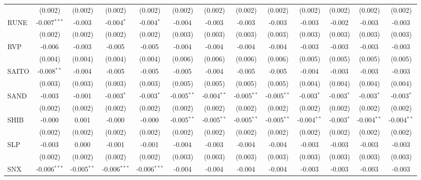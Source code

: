 \begin{table}[!htbp]
\begin{tabular}{@{\extracolsep{5pt}}lcccccccccccc}
  & (0.002) & (0.002) & (0.002) & (0.002) & (0.002) & (0.002) & (0.002) & (0.002) & (0.002) & (0.002) & (0.002) & (0.002) \\
 RUNE & -0.007$^{***}$ & -0.003$^{}$ & -0.004$^{*}$ & -0.004$^{*}$ & -0.004$^{}$ & -0.003$^{}$ & -0.003$^{}$ & -0.003$^{}$ & -0.003$^{}$ & -0.002$^{}$ & -0.003$^{}$ & -0.003$^{}$ \\
  & (0.002) & (0.002) & (0.002) & (0.002) & (0.003) & (0.003) & (0.003) & (0.003) & (0.003) & (0.003) & (0.003) & (0.003) \\
 RVP & -0.006$^{}$ & -0.003$^{}$ & -0.005$^{}$ & -0.005$^{}$ & -0.004$^{}$ & -0.004$^{}$ & -0.004$^{}$ & -0.004$^{}$ & -0.003$^{}$ & -0.003$^{}$ & -0.003$^{}$ & -0.003$^{}$ \\
  & (0.004) & (0.004) & (0.004) & (0.004) & (0.006) & (0.006) & (0.006) & (0.006) & (0.005) & (0.005) & (0.005) & (0.005) \\
 SAITO & -0.008$^{**}$ & -0.004$^{}$ & -0.005$^{}$ & -0.005$^{}$ & -0.005$^{}$ & -0.004$^{}$ & -0.005$^{}$ & -0.005$^{}$ & -0.004$^{}$ & -0.003$^{}$ & -0.003$^{}$ & -0.003$^{}$ \\
  & (0.003) & (0.003) & (0.003) & (0.003) & (0.005) & (0.005) & (0.005) & (0.005) & (0.004) & (0.004) & (0.004) & (0.004) \\
 SAND & -0.003$^{}$ & -0.001$^{}$ & -0.003$^{*}$ & -0.003$^{*}$ & -0.005$^{**}$ & -0.004$^{**}$ & -0.005$^{**}$ & -0.005$^{**}$ & -0.003$^{*}$ & -0.003$^{*}$ & -0.003$^{*}$ & -0.003$^{*}$ \\
  & (0.002) & (0.002) & (0.002) & (0.002) & (0.002) & (0.002) & (0.002) & (0.002) & (0.002) & (0.002) & (0.002) & (0.002) \\
 SHIB & -0.000$^{}$ & 0.001$^{}$ & -0.000$^{}$ & -0.000$^{}$ & -0.005$^{**}$ & -0.005$^{**}$ & -0.005$^{**}$ & -0.005$^{**}$ & -0.004$^{**}$ & -0.003$^{*}$ & -0.004$^{**}$ & -0.004$^{**}$ \\
  & (0.002) & (0.002) & (0.002) & (0.002) & (0.002) & (0.002) & (0.002) & (0.002) & (0.002) & (0.002) & (0.002) & (0.002) \\
 SLP & -0.003$^{}$ & 0.000$^{}$ & -0.001$^{}$ & -0.001$^{}$ & -0.004$^{}$ & -0.003$^{}$ & -0.004$^{}$ & -0.004$^{}$ & -0.003$^{}$ & -0.003$^{}$ & -0.003$^{}$ & -0.003$^{}$ \\
  & (0.002) & (0.002) & (0.002) & (0.002) & (0.003) & (0.003) & (0.003) & (0.003) & (0.003) & (0.003) & (0.003) & (0.003) \\
 SNX & -0.006$^{***}$ & -0.005$^{**}$ & -0.006$^{***}$ & -0.006$^{***}$ & -0.004$^{}$ & -0.004$^{}$ & -0.004$^{}$ & -0.004$^{}$ & -0.003$^{}$ & -0.003$^{}$ & -0.003$^{}$ & -0.003$^{}$ \\

\end{tabular}
\end{table}
